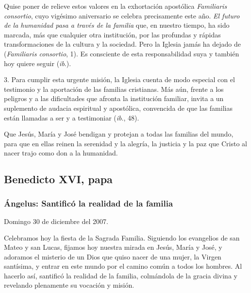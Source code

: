 \begin{body}
\begin{body}
Quise poner de relieve estos valores en la exhortación apostólica \emph{Familiaris consortio}, cuyo vigésimo aniversario se celebra precisamente este año. \emph{El futuro de la humanidad pasa a través de la familia} que, en nuestro tiempo, ha sido marcada, más que cualquier otra institución, por las profundas y rápidas transformaciones de la cultura y la sociedad. Pero la Iglesia jamás ha dejado de  (\emph{Familiaris consortio}, 1). Es consciente de esta responsabilidad suya y también hoy quiere seguir  (\emph{ib}.).

3. Para cumplir esta urgente misión, la Iglesia cuenta de modo especial con el testimonio y la aportación de las familias cristianas. Más aún, frente a los peligros y a las dificultades que afronta la institución familiar, invita a un suplemento de audacia espiritual y apostólica, convencida de que las familias están llamadas a ser  y a testimoniar  (\emph{ib}., 48).

Que Jesús, María y José bendigan y protejan a todas las familias del mundo, para que en ellas reinen la serenidad y la alegría, la justicia y la paz que Cristo al nacer trajo como don a la humanidad.

\subsection{Benedicto XVI, papa}

\subsubsection{Ángelus: Santificó la realidad de la familia}

Domingo 30 de diciembre del 2007.

Celebramos hoy la fiesta de la Sagrada Familia. Siguiendo los evangelios de san Mateo y san Lucas, fijamos hoy nuestra mirada en Jesús, María y José, y adoramos el misterio de un Dios que quiso nacer de una mujer, la Virgen santísima, y entrar en este mundo por el camino común a todos los hombres. Al hacerlo así, santificó la realidad de la familia, colmándola de la gracia divina y revelando plenamente su vocación y misión.


\end{body}
\end{body}
